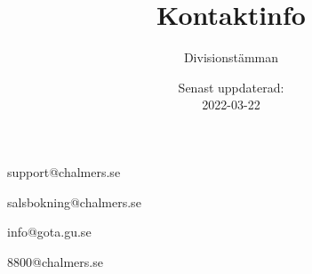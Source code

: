 \documentclass{dvd}
\begin{document}
	\title{Kontaktinfo}
	\author{Divisionstämman}
	\date{Senast uppdaterad:\\2022-03-22}

	\begin{description}
		\item support@chalmers.se %
		\item salsbokning@chalmers.se %
                \item info@gota.gu.se %
                \item 8800@chalmers.se %
	\end{description}
\end{document}
